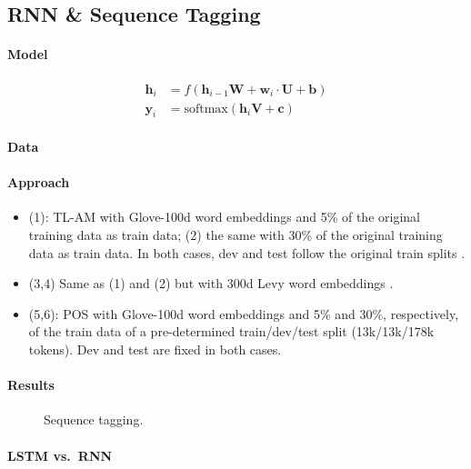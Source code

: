 \documentclass[11pt,a4paper]{article}
\begin{document}
\subsection{RNN \& Sequence Tagging}

\paragraph{Model}

\begin{align*}
  \mathbf{h}_i &= f(\mathbf{h}_{i-1}\mathbf{W}+\mathbf{w}_i\cdot\mathbf{U}+\mathbf{b})\\
  \mathbf{y}_i &= \text{softmax}(\mathbf{h}_i\mathbf{V}+\mathbf{c})
\end{align*}

\paragraph{Data}

\paragraph{Approach}

\begin{itemize}[noitemsep,leftmargin=0.6cm]
  \item (1): TL-AM with Glove-100d word embeddings and 5\% of the original training data as train data; (2) the same with 30\% of the original training data as train data. In both cases, dev and test follow the original train splits \cite{Eger:2017}.
  \item (3,4) Same as (1) and (2) but with 300d Levy word embeddings \cite{Levy:2014}.
  \item (5,6): POS with Glove-100d word embeddings and 5\% and 30\%, respectively, of the train data of a pre-determined train/dev/test split (13k/13k/178k tokens). Dev and test are fixed in both cases.
\end{itemize}

\paragraph{Results}

\begin{figure}[!htb]
\centering
\scalebox{0.5}{
}
\caption{Sequence tagging.}
\label{fig:seq}
\end{figure}

\paragraph{LSTM vs.\ RNN}
\end{document}
